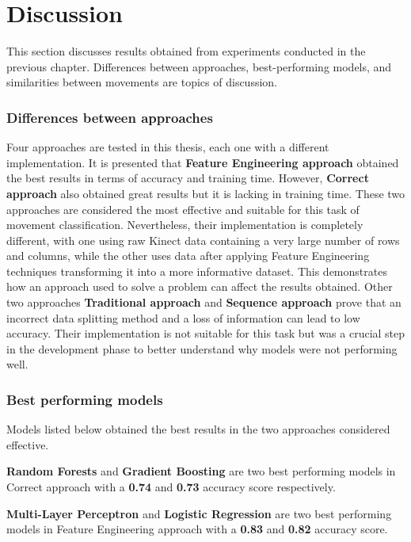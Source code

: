 \section{Discussion}
        
        This section discusses results obtained from experiments conducted in the previous chapter. Differences between approaches, best-performing models, and similarities between movements are topics of discussion. 

        \subsubsection{Differences between approaches}
            Four approaches are tested in this thesis, each one with a different implementation. It is presented that \textbf{Feature Engineering approach} obtained the best results in terms of accuracy and training time. However, \textbf{Correct approach} also obtained great results but it is lacking in training time. These two approaches are considered the most effective and suitable for this task of movement classification. Nevertheless, their implementation is completely different, with one using raw Kinect data containing a very large number of rows and columns, while the other uses data after applying Feature Engineering techniques transforming it into a more informative dataset. This demonstrates how an approach used to solve a problem can affect the results obtained. Other two approaches \textbf{Traditional approach} and \textbf{Sequence approach} prove that an incorrect data splitting method and a loss of information can lead to low accuracy. Their implementation is not suitable for this task but was a crucial step in the development phase to better understand why models were not performing well. 

        \subsubsection{Best performing models}
            Models listed below obtained the best results in the two approaches considered effective. 

            \begin{boxlabel}
                \item \textbf{Random Forests} and \textbf{Gradient Boosting} are two best performing models in Correct approach with a \textbf{0.74} and \textbf{0.73} accuracy score respectively.
                \item \textbf{Multi-Layer Perceptron} and \textbf{Logistic Regression} are two best performing models in Feature Engineering approach with a \textbf{0.83} and \textbf{0.82} accuracy score.
            \end{boxlabel}

